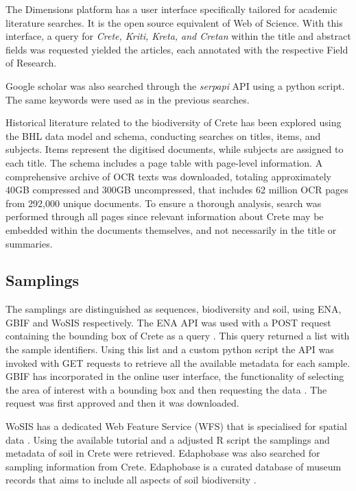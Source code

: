 The Dimensions platform has a user interface specifically tailored for academic literature searches.
It is the open source equivalent of Web of Science.
With this interface, a query for \textit{Crete, Kriti, Kreta, and Cretan} within
the title and abstract fields was requested yielded the articles, each annotated with the respective Field of Research.

Google scholar was also searched through the \textit{serpapi} API using
a python script. The same keywords were used as in the previous searches.

Historical literature related to the biodiversity of Crete has been explored
using the BHL data model and schema, conducting searches on titles, items, and subjects.
Items represent the digitised documents, while subjects are assigned to each title.
The schema includes a page table with page-level information.
A comprehensive archive of OCR texts was downloaded, totaling approximately
40GB compressed and 300GB uncompressed, that includes 62 million OCR pages from 292,000 unique documents.
To ensure a thorough analysis, search was performed through all pages since
relevant information about Crete may be embedded within the documents
themselves, and not necessarily in the title or summaries.

\subsection{Samplings}\label{crete_samplings}

The samplings are distinguished as sequences, biodiversity and soil, using ENA, GBIF and WoSIS respectively.
The ENA API was used with a POST request containing the bounding box of Crete as a query \parencite{Yuan2023}. This 
query returned a list with the sample identifiers. Using this list and a custom python script the API
was invoked with GET requests to retrieve all the available metadata for each sample.
GBIF has incorporated in the online user interface, the functionality of selecting the area of interest with a bounding box and then requesting
the data \parencite{noauthor_gbif_nodate}. The request was first approved and then it was downloaded. 

WoSIS has a dedicated Web Feature Service (WFS) that is specialised for spatial data \parencite{Batjes2024}. 
Using the available tutorial and a adjusted R script the samplings and metadata of 
soil in Crete were retrieved.
Edaphobase was also searched for sampling information from Crete. Edaphobase is
a curated database of museum records that aims to include all aspects of soil biodiversity \parencite{BURKHARDT20143}.

